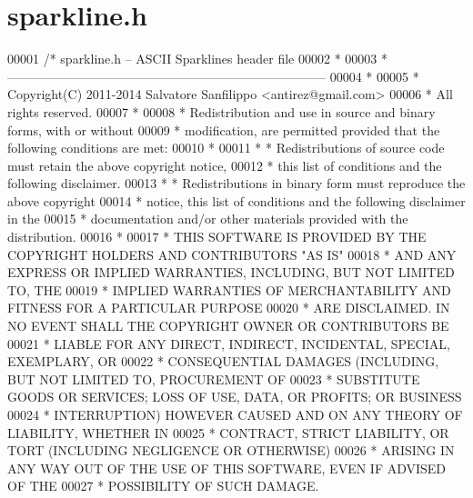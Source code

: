 \hypertarget{sparkline_8h_source}{}\section{sparkline.\+h}
\label{sparkline_8h_source}

\begin{DoxyCode}
00001 \textcolor{comment}{/* sparkline.h -- ASCII Sparklines header file}
00002 \textcolor{comment}{ *}
00003 \textcolor{comment}{ * ---------------------------------------------------------------------------}
00004 \textcolor{comment}{ *}
00005 \textcolor{comment}{ * Copyright(C) 2011-2014 Salvatore Sanfilippo <antirez@gmail.com>}
00006 \textcolor{comment}{ * All rights reserved.}
00007 \textcolor{comment}{ *}
00008 \textcolor{comment}{ * Redistribution and use in source and binary forms, with or without}
00009 \textcolor{comment}{ * modification, are permitted provided that the following conditions are met:}
00010 \textcolor{comment}{ *}
00011 \textcolor{comment}{ *   * Redistributions of source code must retain the above copyright notice,}
00012 \textcolor{comment}{ *     this list of conditions and the following disclaimer.}
00013 \textcolor{comment}{ *   * Redistributions in binary form must reproduce the above copyright}
00014 \textcolor{comment}{ *     notice, this list of conditions and the following disclaimer in the}
00015 \textcolor{comment}{ *     documentation and/or other materials provided with the distribution.}
00016 \textcolor{comment}{ *}
00017 \textcolor{comment}{ * THIS SOFTWARE IS PROVIDED BY THE COPYRIGHT HOLDERS AND CONTRIBUTORS "AS IS"}
00018 \textcolor{comment}{ * AND ANY EXPRESS OR IMPLIED WARRANTIES, INCLUDING, BUT NOT LIMITED TO, THE}
00019 \textcolor{comment}{ * IMPLIED WARRANTIES OF MERCHANTABILITY AND FITNESS FOR A PARTICULAR PURPOSE}
00020 \textcolor{comment}{ * ARE DISCLAIMED. IN NO EVENT SHALL THE COPYRIGHT OWNER OR CONTRIBUTORS BE}
00021 \textcolor{comment}{ * LIABLE FOR ANY DIRECT, INDIRECT, INCIDENTAL, SPECIAL, EXEMPLARY, OR}
00022 \textcolor{comment}{ * CONSEQUENTIAL DAMAGES (INCLUDING, BUT NOT LIMITED TO, PROCUREMENT OF}
00023 \textcolor{comment}{ * SUBSTITUTE GOODS OR SERVICES; LOSS OF USE, DATA, OR PROFITS; OR BUSINESS}
00024 \textcolor{comment}{ * INTERRUPTION) HOWEVER CAUSED AND ON ANY THEORY OF LIABILITY, WHETHER IN}
00025 \textcolor{comment}{ * CONTRACT, STRICT LIABILITY, OR TORT (INCLUDING NEGLIGENCE OR OTHERWISE)}
00026 \textcolor{comment}{ * ARISING IN ANY WAY OUT OF THE USE OF THIS SOFTWARE, EVEN IF ADVISED OF THE}
00027 \textcolor{comment}{ * POSSIBILITY OF SUCH DAMAGE.}

\end{DoxyCode}
